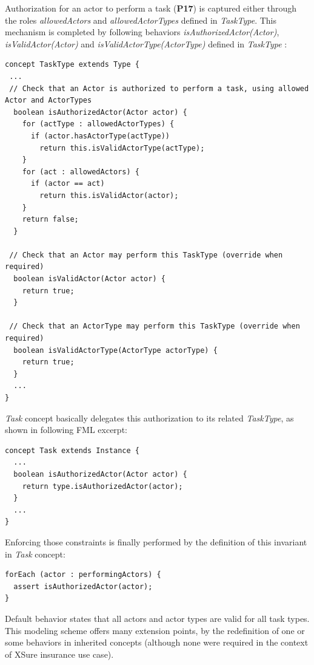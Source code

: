 Authorization for an actor to perform a task (\textbf{P17}) is captured either through the roles \textit{allowedActors} and \textit{allowedActorTypes} defined in \textit{TaskType}. This mechanism is completed by following behaviors \textit{isAuthorizedActor(Actor)}, \textit{isValidActor(Actor)} and \textit{isValidActorType(ActorType)} defined in \textit{TaskType} : 

\begin{lstlisting}
concept TaskType extends Type {
 ...
 // Check that an Actor is authorized to perform a task, using allowed Actor and ActorTypes
  boolean isAuthorizedActor(Actor actor) {      
    for (actType : allowedActorTypes) {        
      if (actor.hasActorType(actType))         
        return this.isValidActorType(actType);          
    }        
    for (act : allowedActors) {        
      if (actor == act)         
        return this.isValidActor(actor);
    }
    return false;
  }
  
 // Check that an Actor may perform this TaskType (override when required)
  boolean isValidActor(Actor actor) {
    return true;
  }

 // Check that an ActorType may perform this TaskType (override when required)
  boolean isValidActorType(ActorType actorType) {
    return true;
  }
  ...
}
\end{lstlisting}

\textit{Task} concept basically delegates this authorization to its related \textit{TaskType}, as shown in following FML excerpt:

\begin{lstlisting}
concept Task extends Instance {
  ...
  boolean isAuthorizedActor(Actor actor) {      
    return type.isAuthorizedActor(actor);      
  }
  ...
}
\end{lstlisting}

Enforcing those constraints is finally performed by the definition of this invariant in \textit{Task} concept:

\begin{lstlisting}
forEach (actor : performingActors) {
  assert isAuthorizedActor(actor);
}
\end{lstlisting}

Default behavior states that all actors and actor types are valid for all task types. This modeling scheme offers many extension points, by the redefinition of one or some behaviors in inherited concepts (although none were required in the context of XSure insurance use case).

